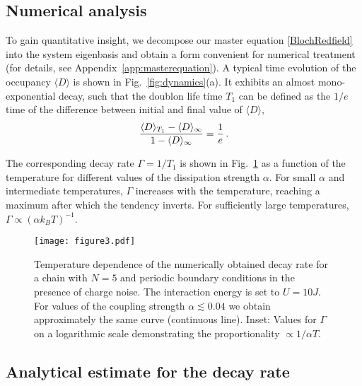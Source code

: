 \documentclass[twocolumn,prb,showpacs]{revtex4-1}
\DeclarePairedDelimiter\mean{\langle}{\rangle}
\begin{document}
\subsection{Numerical analysis \label{sec:numerics}}

To gain quantitative insight, we decompose our master equation
\eqref{BlochRedfield} into the system eigenbasis and obtain a form
convenient for numerical treatment (for details, see
Appendix~\ref{app:masterequation}). A typical time evolution of the occupancy
$\langle D\rangle$ is shown in Fig.~\ref{fig:dynamics}(a).  It exhibits an
almost mono-exponential decay, such that the doublon life time $T_1$ can be
defined as the $1/e$ time of the difference between initial and final
value of $\langle D\rangle$,
\begin{equation}
    \frac{\mean{D}_{T_1}-\mean{D}_\infty}{1-\mean{D}_\infty}=\frac{1}{e} \,.
    \label{eq:numericgamma}
\end{equation}

The corresponding decay rate $\Gamma = 1/T_1$ is shown in
Fig.~\ref{fig:numerics_occup} as a function of the temperature for different
values of the dissipation strength $\alpha$. For small $\alpha$ and
intermediate temperatures, $\Gamma$ increases with the temperature,
reaching a maximum after which the tendency inverts.  For sufficiently
large temperatures, $\Gamma \propto (\alpha k_B T)^{-1}$.

\begin{figure}[tb] 
    \centering\texttt{[image: figure3.pdf]} 
    \caption{Temperature dependence of the numerically obtained decay rate 
        for a chain with $N=5$ and periodic boundary conditions in the presence
        of charge noise. The interaction energy is set to $U=10J$. For values 
        of the coupling strength $\alpha\lesssim 0.04$ we obtain approximately 
        the same curve (continuous line). Inset: Values for $\Gamma$ on a 
        logarithmic scale demonstrating the proportionality 
        $\propto 1/\alpha T$.} 
\label{fig:numerics_occup}
\end{figure}

\subsection{Analytical estimate for the decay rate}
\end{document}
